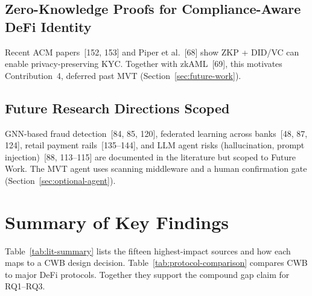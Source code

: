 \documentclass[12pt,a4paper]{report}
\begin{document}
\subsection{Zero-Knowledge Proofs for Compliance-Aware DeFi Identity}
\label{sec:lit-zkp-defi}

Recent ACM papers~[152, 153] and Piper et al.~[68] show ZKP + DID/VC can enable privacy-preserving KYC. Together with zkAML~[69], this motivates Contribution~4, deferred past MVT (Section~\ref{sec:future-work}).

\subsection{Future Research Directions Scoped}
\label{sec:lit-gnn}
\label{sec:lit-fl}
\label{sec:lit-retail-payments}
\label{sec:lit-llm}
\label{sec:harness-lit}

GNN-based fraud detection~[84, 85, 120], federated learning across banks~[48, 87, 124], retail payment rails~[135--144], and LLM agent risks (hallucination, prompt injection)~[88, 113--115] are documented in the literature but scoped to Future Work. The MVT agent uses scanning middleware and a human confirmation gate (Section~\ref{sec:optional-agent}).

\section{Summary of Key Findings}
\label{sec:comparative-protocol}

Table~\ref{tab:lit-summary} lists the fifteen highest-impact sources and how each maps to a CWB design decision. Table~\ref{tab:protocol-comparison} compares CWB to major DeFi protocols. Together they support the compound gap claim for RQ1--RQ3.
\end{document}
